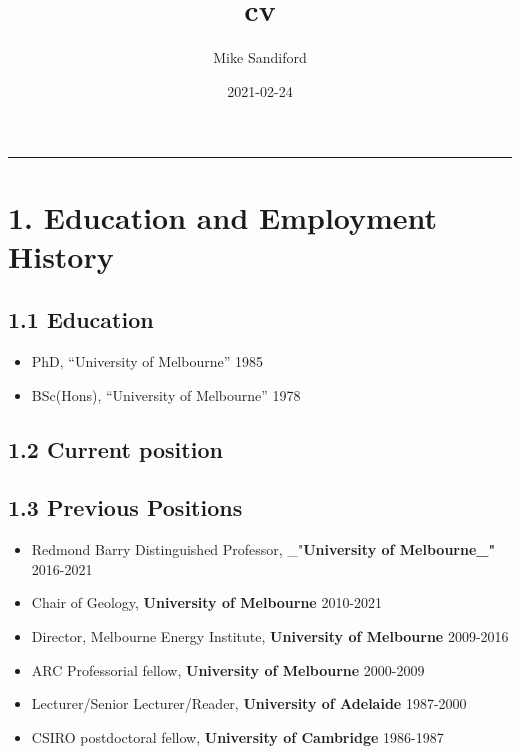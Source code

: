 \documentclass[
]{article}
\title{cv}
\author{Mike Sandiford}
\date{2021-02-24}
\providecommand{\tightlist}{%
  \setlength{\itemsep}{0pt}\setlength{\parskip}{0pt}}
\begin{document}
\maketitle

\begin{center}\rule{0.5\linewidth}{0.5pt}\end{center}

\hypertarget{education-and-employment-history}{%
\section{1. Education and Employment
History}\label{education-and-employment-history}}

\hypertarget{education}{%
\subsection{1.1 Education}\label{education}}

\begin{itemize}
\tightlist
\item
  PhD, ``University of Melbourne'' 1985
\item
  BSc(Hons), ``University of Melbourne'' 1978
\end{itemize}

\hypertarget{current-position}{%
\subsection{1.2 Current position}\label{current-position}}

\hypertarget{previous-positions}{%
\subsection{1.3 Previous Positions}\label{previous-positions}}

\begin{itemize}
\tightlist
\item
  Redmond Barry Distinguished Professor, \_"\textbf{University of
  Melbourne\_"} 2016-2021
\item
  Chair of Geology, \textbf{University of Melbourne} 2010-2021
\item
  Director, Melbourne Energy Institute, \textbf{University of Melbourne}
  2009-2016
\item
  ARC Professorial fellow, \textbf{University of Melbourne} 2000-2009
\item
  Lecturer/Senior Lecturer/Reader, \textbf{University of Adelaide}
  1987-2000
\item
  CSIRO postdoctoral fellow, \textbf{University of Cambridge} 1986-1987
\end{itemize}
\end{document}
